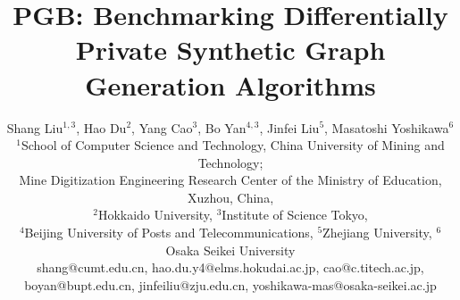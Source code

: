 \documentclass[conference]{IEEEtran}
\theoremstyle{plain}
\begin{document}
\title{PGB: Benchmarking Differentially Private Synthetic Graph Generation Algorithms}

\makeatletter
\newcommand{\linebreakand}{%
  \end{@IEEEauthorhalign}
  \hfill\mbox{}\par
  \mbox{}\hfill\begin{@IEEEauthorhalign}
}
\makeatother

\author{
Shang Liu$^{1,3}$,
Hao Du$^2$,
Yang Cao$^3$,
Bo Yan$^{4,3}$,
Jinfei Liu$^5$,
Masatoshi Yoshikawa$^{6}$
\vspace{5pt} \\

$^{1}$School of Computer Science and Technology, China University of Mining and Technology;\\
Mine Digitization Engineering Research Center of the Ministry of Education, Xuzhou, China, \\
$^2$Hokkaido University,
$^3$Institute of Science Tokyo, \\
$^4$Beijing University of Posts and Telecommunications,
$^5$Zhejiang University,
$^6$Osaka Seikei University 
\vspace{5pt} \\

shang@cumt.edu.cn,
hao.du.y4@elms.hokudai.ac.jp,
cao@c.titech.ac.jp,\\
boyan@bupt.edu.cn,
jinfeiliu@zju.edu.cn,
yoshikawa-mas@osaka-seikei.ac.jp
}



\end{document}
